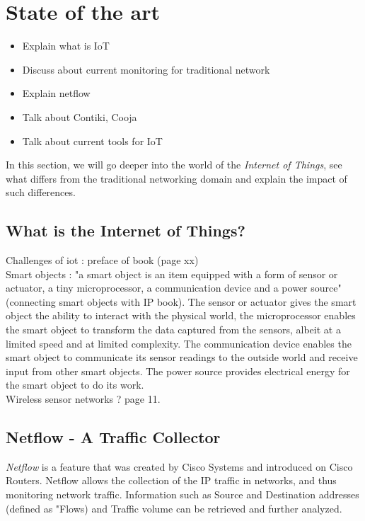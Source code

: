 \section{State of the art}

\begin{itemize}
	\item Explain what is IoT
	\item Discuss about current monitoring for traditional network
	\item Explain netflow
	\item Talk about Contiki, Cooja
	\item Talk about current tools for IoT
\end{itemize}

In this section, we will go deeper into the world of the \textit{Internet of Things}, see what differs from the traditional networking domain and explain the impact of such differences. \\

\subsection{What is the Internet of Things?}
Challenges of iot : preface of book (page xx)\\

Smart objects : "a smart object is an item equipped with a form of sensor or actuator, a tiny microprocessor, a communication device and a power source"(connecting smart objects with IP book). The sensor or actuator gives the smart object the ability to interact with the physical world, the microprocessor enables the smart object to transform the data captured from the sensors, albeit at a limited speed and at limited complexity. The communication device enables the smart object to communicate its sensor readings to the outside world and receive input from other smart objects. The power source provides electrical energy for the smart object to do its work. \\

Wireless sensor networks ? page 11. 

\subsection{Netflow - A Traffic Collector}
\textit{Netflow} is a feature that was created by Cisco Systems and introduced on Cisco Routers. Netflow allows the collection of the IP traffic in networks, and thus monitoring network traffic. Information such as Source and Destination addresses (defined as "Flows) and Traffic volume can be retrieved and further analyzed.\\


